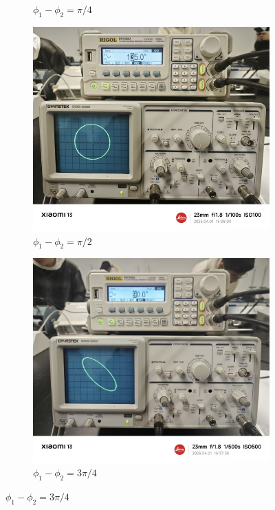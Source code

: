 \documentclass[12pt,a4paper]{article}
\begin{document}
\begin{figure}[H]
\begin{subfigure}[b]{0.23\textwidth}
			\caption{$\phi_1-\phi_2=\pi/4$}
			\label{fig:subpi4}
		\end{subfigure}
		\hfill
		\begin{subfigure}[b]{0.23\textwidth}
			\centering
			\includegraphics[width=\textwidth]{90.jpg}
			\caption{$\phi_1-\phi_2=\pi/2$}
			\label{fig:subpi2}
		\end{subfigure}
		\hfill
		\begin{subfigure}[b]{0.23\textwidth}
			\centering
			\includegraphics[width=\textwidth]{135.jpg}
			\caption{$\phi_1-\phi_2=3\pi/4$}
			\label{fig:sub3pi4}
		\end{subfigure}
		

\end{figure}
\end{document}
